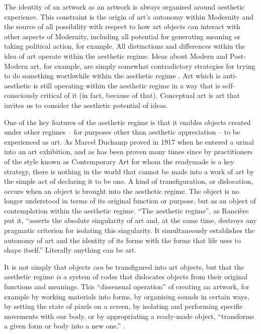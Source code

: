 \documentclass[letterpaper]{article}
\begin{document}
    The identity of an artwork as an artwork is always organised around aesthetic experience. This constraint is the origin of art's autonomy within Modernity and the source of all possibility with respect to how art objects can interact with other aspects of Modernity, including all potential for generating meaning or taking political action, for example. All distinctions and differences within the idea of art operate within the aesthetic regime. Ideas about Modern and Post-Modern art, for example, are simply somewhat contradictory strategies for trying to do something worthwhile within the aesthetic regime \citep[p213]{ZepkeSblmArt2017}. Art which is anti-aesthetic is still operating within the aesthetic regime in a way that is self-consciously critical of it (in fact, because of that). Conceptual art is art that invites us to consider the aesthetic potential of ideas.

    One of the key features of the aesthetic regime is that it enables objects created under other regimes – for purposes other than aesthetic appreciation – to be experienced as art. As Marcel Duchamp proved in 1917 when he entered a urinal into an art exhibition, and as has been proven many times since by practitioners of the style known as Contemporary Art for whom the readymade is a key strategy, there is nothing in the world that cannot be made into a work of art by the simple act of declaring it to be one. A kind of transfiguration, or dislocation, occurs when an object is brought into the aesthetic regime. The object is no longer understood in terms of its original function or purpose, but as an object of contemplation within the aesthetic regime. “The aesthetic regime”, as Rancière put it, “asserts the absolute singularity of art and, at the same time, destroys any pragmatic criterion for isolating this singularity. It simultaneously establishes the autonomy of art and the identity of its forms with the forms that life uses to shape itself.” Literally anything can be art.
    
    It is not simply that objects \emph{can} be transfigured into art objects, but that the aesthetic regime \emph{is} a system of codes that dislocates objects from their original functions and meanings. This “dissensual operation” of creating an artwork, for example by working materials into forms, by organising sounds in certain ways, by setting the state of pixels on a screen, by isolating and performing specific movements with our body, or by appropriating a ready-made object, “transforms a given form or body into a new one.” \citep[p.54]{RancierThEmncptdSpcttr2009}.
\end{document}
